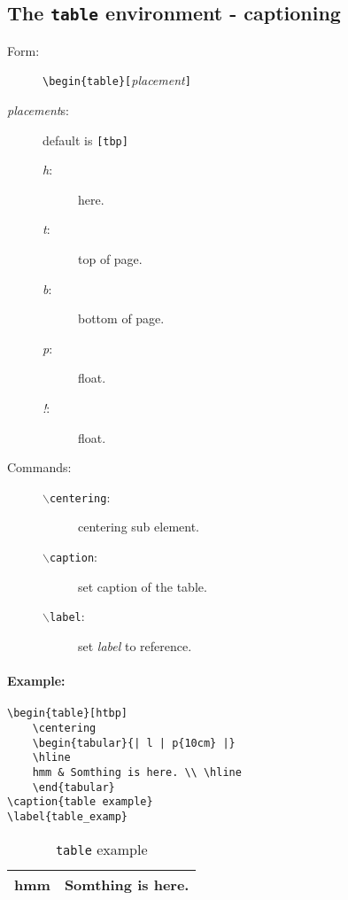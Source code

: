 \documentclass[11pt,a4paper]{article}
\begin{document}
\subsection[\texttt{table}]{The \texttt{table} environment - captioning}
\begin{description}
	\item[Form:] \verb|\begin{table}[|\emph{placement}\verb|]|
	\item[\emph{placement}s:] default is \verb|[tbp]|\hfill
		\begin{description}
			\item[\emph{h}:] here.
			\item[\emph{t}:] top of page.
			\item[\emph{b}:] bottom of page.
			\item[\emph{p}:] float.
			\item[\emph{!}:] float.
		\end{description}
	\item[Commands:] \hfill
		\begin{description}
			\item[\texttt{$\backslash$centering}:] centering sub element.
			\item[\texttt{$\backslash$caption}:] set caption of the table.
			\item[\texttt{$\backslash$label}:] set \emph{label} to reference.
		\end{description}
\end{description}

\paragraph{Example:}
\begin{verbatim}
\begin{table}[htbp]
	\centering
	\begin{tabular}{| l | p{10cm} |}
	\hline
	hmm & Somthing is here. \\ \hline
	\end{tabular}
\caption{table example}
\label{table_examp}
\end{verbatim}

\begin{table}[htbp]
	\centering
	\begin{tabular}{| l | p{10cm} |}
	\hline
	hmm & Somthing is here. \\ \hline
	\end{tabular}
	\caption{\texttt{table} example}
	\label{table_examp}
\end{table}
\end{document}
